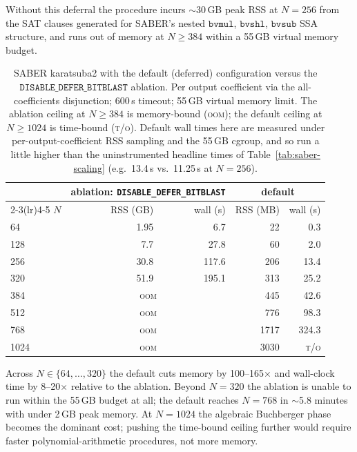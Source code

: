 \documentclass[runningheads]{llncs}
\begin{document}
Without this deferral the procedure incurs $\sim$30\,GB peak RSS
at $N = 256$ from the SAT clauses generated for SABER's nested
$\mathtt{bvmul}$, $\mathtt{bvshl}$, $\mathtt{bvsub}$ SSA
structure, and runs out of memory at $N \geq 384$ within a
55\,GB virtual memory budget.

\begin{table}[ht]
\caption{SABER karatsuba2 with the default (deferred) configuration
versus the $\texttt{DISABLE\_DEFER\_BITBLAST}$ ablation. Per output
coefficient via the all-coefficients disjunction; 600\,s timeout;
55\,GB virtual memory limit. The ablation ceiling at
$N \geq 384$ is memory-bound (\textsc{oom}); the default ceiling
at $N \geq 1024$ is time-bound (\textsc{t/o}). Default wall times
here are measured under per-output-coefficient RSS sampling and
the 55\,GB cgroup, and so run a little higher than the
uninstrumented headline times of Table~\ref{tab:saber-scaling}
(e.g.\ 13.4\,s vs.\ 11.25\,s at $N=256$).}
\label{tab:saber-defer}
\centering
\small
\begin{tabular}{lrrrr}
\toprule
& \multicolumn{2}{c}{ablation: \texttt{DISABLE\_DEFER\_BITBLAST}}
& \multicolumn{2}{c}{default} \\
\cmidrule(lr){2-3}\cmidrule(lr){4-5}
$N$ & RSS (GB) & wall (s) & RSS (MB) & wall (s) \\
\midrule
64   & 1.95  & 6.7    & 22   & 0.3 \\
128  & 7.7   & 27.8   & 60   & 2.0 \\
256  & 30.8  & 117.6  & 206  & 13.4 \\
320  & 51.9  & 195.1  & 313  & 25.2 \\
384  & \multicolumn{2}{c}{\textsc{oom}}  & 445  & 42.6 \\
512  & \multicolumn{2}{c}{\textsc{oom}}  & 776  & 98.3 \\
768  & \multicolumn{2}{c}{\textsc{oom}}  & 1717 & 324.3 \\
1024 & \multicolumn{2}{c}{\textsc{oom}}  & 3030 & \textsc{t/o} \\
\bottomrule
\end{tabular}
\end{table}

Across $N \in \{64, \ldots, 320\}$ the default cuts memory by
100--165$\times$ and wall-clock time by 8--20$\times$ relative to
the ablation. Beyond $N = 320$ the ablation is unable to run
within the 55\,GB budget at all; the default reaches $N = 768$
in $\sim$5.8 minutes with under 2\,GB peak memory. At
$N = 1024$ the algebraic Buchberger phase becomes the dominant
cost; pushing the time-bound ceiling further would require
faster polynomial-arithmetic procedures, not more memory.
\end{document}

